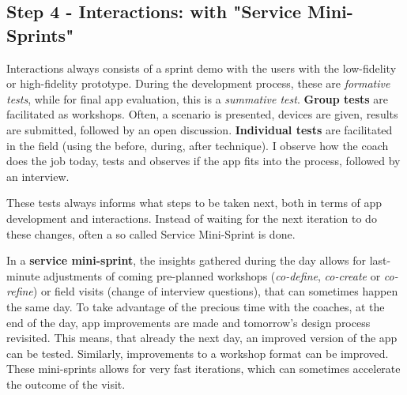   \subsection{Step 4 - Interactions: with "Service Mini-Sprints"}
  Interactions always consists of a sprint demo with the users with the low-fidelity or high-fidelity prototype. During the development process, these are \textit{formative tests}, while for final app evaluation, this is a \textit{summative test}. \textbf{Group tests} are facilitated as workshops. Often, a scenario is presented, devices are given, results are submitted, followed by an open discussion. \textbf{Individual tests} are facilitated in the field (using the before, during, after technique). I observe how the coach does the job today, tests and observes if the app fits into the process, followed by an interview.

    These tests always informs what steps to be taken next, both in terms of app development and interactions. Instead of waiting for the next iteration to do these changes, often a so called Service Mini-Sprint is done.

    In a \textbf{service mini-sprint}\label{mini-sprint}, the insights gathered during the day allows for last-minute adjustments of coming pre-planned workshops (\textit{co-define}, \textit{co-create} or \textit{co-refine}) or field visits (change of interview questions), that can sometimes happen the same day. To take advantage of the precious time with the coaches, at the end of the day, app improvements are made and tomorrow's design process revisited. This means, that already the next day, an improved version of the app can be tested. Similarly, improvements to a workshop format can be improved. These mini-sprints allows for very fast iterations, which can sometimes accelerate the outcome of the visit.
